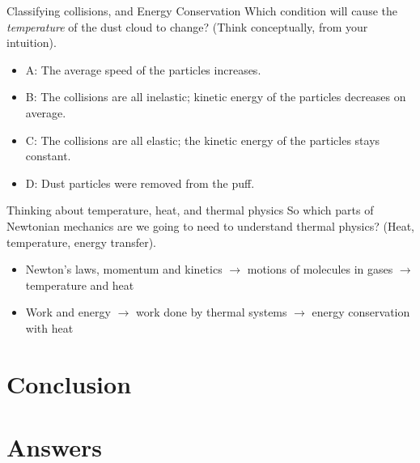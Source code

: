 \documentclass{beamer}
\begin{document}
\begin{frame}{Classifying collisions, and Energy Conservation}
Which condition will cause the \textit{temperature} of the dust cloud to change?  (Think conceptually, from your intuition).
\begin{itemize}
\item A: The average speed of the particles increases.
\item B: The collisions are all inelastic; kinetic energy of the particles decreases on average.
\item C: The collisions are all elastic; the kinetic energy of the particles stays constant.
\item D: Dust particles were removed from the puff.
\end{itemize}
\end{frame}

\begin{frame}{Thinking about temperature, heat, and thermal physics}
So which parts of Newtonian mechanics are we going to need to understand thermal physics? (Heat, temperature, energy transfer).
\begin{itemize}
\item Newton's laws, momentum and kinetics $\rightarrow$ motions of molecules in gases $\rightarrow$ temperature and heat
\item Work and energy $\rightarrow$ work done by thermal systems $\rightarrow$ energy conservation with heat
\end{itemize}
\end{frame}

\section{Conclusion}

\section{Answers}
\end{document}
